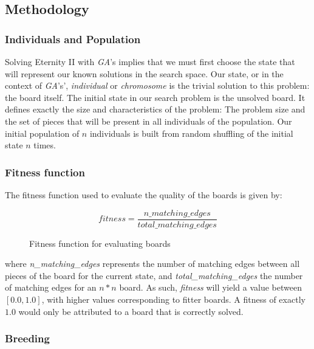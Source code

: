 \documentclass{llncs}
\begin{document}
\subsection{Methodology}\label{sec:methodology}

\subsubsection{Individuals and Population}
Solving Eternity II with \textit{GA}'s implies that we must first choose the state that will represent our known solutions in the search space. Our state, or in the context of \textit{GA}'s', \textit{individual} or \textit{chromosome} is the trivial solution to this problem: the board itself.
The initial state in our search problem is the unsolved board. It defines exactly the size and characteristics of the problem: The problem size and the set of pieces that will be present in all individuals of the population.
Our initial population of $n$ individuals is built from random shuffling of the initial state $n$ times.

\subsubsection{Fitness function}\label{sec:fitness-function}

The fitness function used to evaluate the quality of the boards is given by:

\begin{figure}[h]
	\begin{equation}
		fitness = \frac{n\_matching\_edges}{total\_matching\_edges}
	\end{equation}
	\caption{Fitness function for evaluating boards}
	\label{fig:eq:fitness_function}
\end{figure}

where \textit{n\_matching\_edges} represents the number of matching edges between all pieces of the board for the current state, and \textit{total\_matching\_edges} the number of matching edges for an $n*n$ board. As such, \textit{fitness} will yield a value between $[0.0, 1.0]$, with higher values corresponding to fitter boards. A fitness of exactly $1.0$ would only be attributed to a board that is correctly solved.

\subsubsection{Breeding}\label{sec:breeding}
\end{document}
